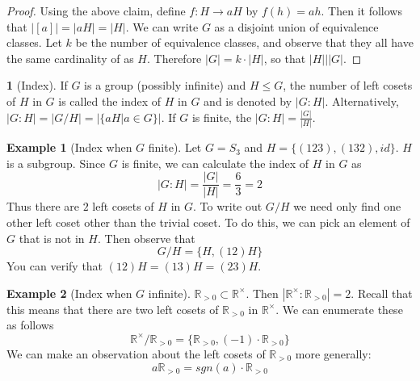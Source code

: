 \documentclass[12pt]{article}
\theoremstyle{definition}
\newtheorem{definition}{\color{NavyBlue}{\textbf{Definition}}}
\newtheorem{example}{\color{WildStrawberry}Example}
\theoremstyle{definition}
\begin{document}
\begin{proof}
Using the above claim, define $f : H \to aH$ by $f(h) = ah$. Then it follows that $|[a] | = |aH| = |H|$. We can write $G$ as a disjoint union of equivalence classes. Let $k$ be the number of equivalence classes, and observe that they all have the same cardinality of as $H$. Therefore $|G| = k \cdot |H|$, so that $|H| \big\vert |G|$.
\end{proof}

\begin{definition}[Index]
If $G$ is a group (possibly infinite) and $H \leq G$, the number of left cosets of $H$ in $G$ is called the index of $H$ in $G$ and is denoted by $|G : H|$. Alternatively, $|G : H| = | G / H | =  |\{aH | a \in G\} |$. If $G$ is finite, the $|G:H| = \frac{|G|}{|H|}$.
\end{definition}

\begin{example}[Index when $G$ finite]
Let $G = S_3$ and $H = \{ (1 2 3), (1 3 2), id \}$. $H$ is a subgroup. Since $G$ is finite, we can calculate the index of $H$ in $G$ as
\begin{equation}
	|G : H| = \frac{|G|}{|H|} = \frac{6}{3} = 2
\end{equation}
Thus there are $2$ left cosets of $H$ in $G$. To write out $G/H$ we need only find one other left coset other than the trivial coset. To do this, we can pick an element of $G$ that is not in $H$. Then observe that 
\begin{equation}
	G/H = \{H, (1 2) H \}
\end{equation}
You can verify that $(1 2) H = (1 3) H = (2 3) H$.
\end{example}

\begin{example}[Index when $G$ infinite]
$\mathbb{R}_{>0} \subset \mathbb{R}^{\times}$. Then $|\mathbb{R}^{\times} : \mathbb{R}_{> 0}| = 2$. Recall that this means that there are two left cosets of $\mathbb{R}_{>0}$ in $\mathbb{R}^{\times}$. We can enumerate these as follows
\begin{equation}
	\mathbb{R}^{\times} / \mathbb{R}_{> 0} = \{\mathbb{R}_{> 0}, (-1) \cdot \mathbb{R}_{> 0}\}
\end{equation}
We can make an observation about the left cosets of $\mathbb{R}_{> 0}$ more generally:
\begin{equation}
	a \mathbb{R}_{> 0} = sgn(a) \cdot \mathbb{R}_{> 0}
\end{equation}
\end{example}
\end{document}
